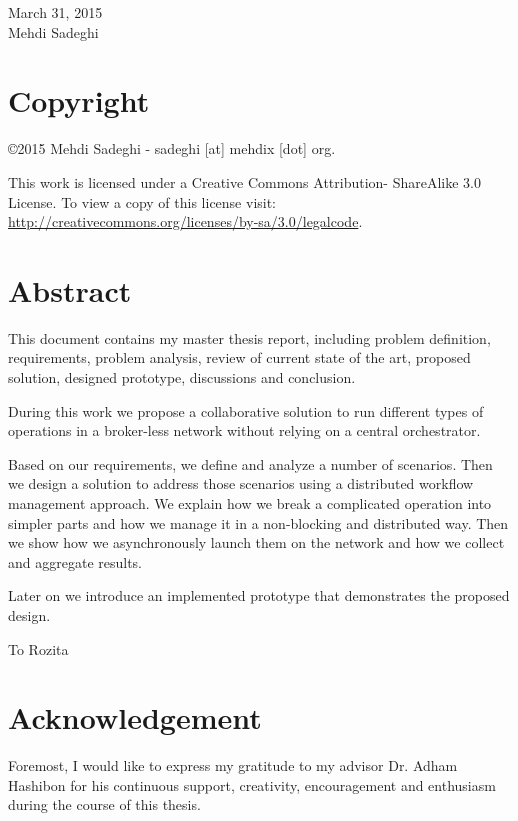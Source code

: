 \documentclass[12pt, a4paper, oneside]{report}
\newcounter{chapter_count}
\newenvironment{dedication}
  {\clearpage           %
   \thispagestyle{empty}%
   \vspace*{\stretch{1}}%
   \itshape             %
  }
  {\par %
   \vspace{\stretch{3}} %
   \clearpage           %
  }
\begin{document}
March 31, 2015 \\

Mehdi Sadeghi

\thispagestyle{empty} 
\clearpage

\chapter*{Copyright}
\noindent
\begin{flushleft}
\copyright 2015 Mehdi Sadeghi - sadeghi [at] mehdix [dot] org.
 
This work is licensed under a Creative Commons Attribution- ShareAlike 3.0 License.
To view a copy of this license visit:
\url{http://creativecommons.org/licenses/by-sa/3.0/legalcode}.
\end{flushleft}

\thispagestyle{empty} 

\chapter*{Abstract}
This document contains my master thesis report, including problem definition, requirements, problem analysis,
review of current state of the art, proposed solution, designed prototype, discussions and conclusion.

During this work we propose a collaborative solution to run different types of operations 
in a broker-less network without relying on a central orchestrator. 

Based on our requirements, we define and analyze a number of scenarios.
Then we design a solution to address those scenarios using a distributed workflow management approach. 
We explain how we break a complicated operation into simpler parts 
and how we manage it in a non-blocking and distributed way.
Then we show how we asynchronously launch them on the network and 
how we collect and aggregate results.

Later on we introduce an implemented prototype that demonstrates the proposed design.

\thispagestyle{empty} 
\clearpage

\begin{dedication}
To Rozita
\end{dedication}


\chapter*{Acknowledgement}
Foremost, I would like to express my gratitude to my advisor Dr. Adham Hashibon for his continuous support, creativity,
encouragement and enthusiasm during the course of this thesis.
\end{document}
